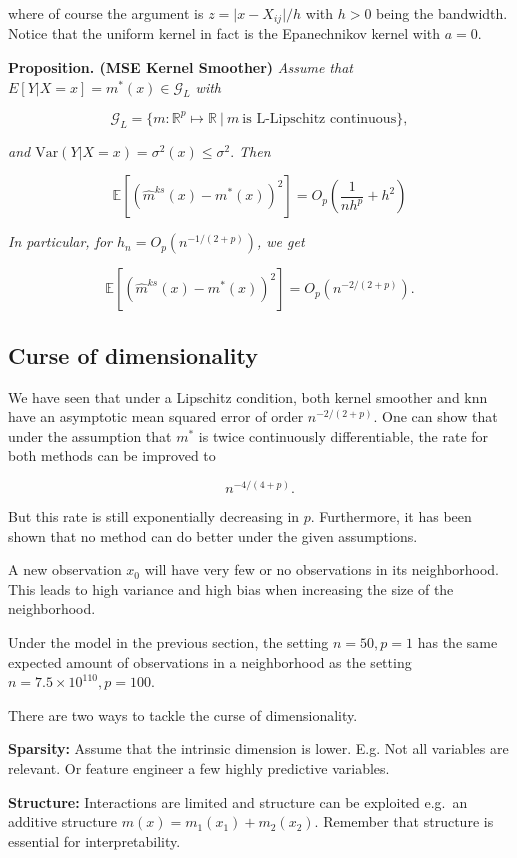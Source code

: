 \documentclass[a4paper,10pt,openany]{book}
\begin{document}
where of course the argument is \(z=\vert x-X_{ij}\vert/h\) with \(h>0\) being the bandwidth. Notice that the uniform kernel in fact is the Epanechnikov kernel with \(a=0\).

\textbf{Proposition. (MSE Kernel Smoother)} \emph{Assume that \(E[Y|X=x]=m^\ast(x)\in \mathcal G_L\) with}

\[
\mathcal G_L = \{m: \mathbb R^p \mapsto \mathbb R\ |\  m \ \text{is L-Lipschitz continuous}\},
\]

\emph{and \(\textrm{Var}(Y|X=x)=\sigma^2(x)\leq \sigma^2.\) Then }

\[
\mathbb E[(\hat m^{ks}(x)-m^\ast(x))^2]= O_p\left( \frac{1}{nh^p} + h^2 \right)
\]

\emph{In particular, for \(h_n=O_p(n^{-1/(2+p)})\), we get }

\[
\mathbb E[(\hat m^{ks}(x)-m^\ast(x))^2]=O_p(n^{-2/(2+p)}).
\]

\hypertarget{curse-of-dimensionality}{%
\subsection{Curse of dimensionality}\label{curse-of-dimensionality}}

We have seen that under a Lipschitz condition, both kernel smoother and knn have an asymptotic mean squared error of order \(n^{-2/(2+p)}\). One can show that under the assumption that \(m^\ast\) is twice continuously differentiable, the rate for both methods can be improved to

\[
n^{-4/(4+p)}.
\]

But this rate is still exponentially decreasing in \(p\). Furthermore, it has been shown that no method can do better under the given assumptions.

A new observation \(x_0\) will have very few or no observations in its neighborhood. This leads to high variance and high bias when increasing the size of the neighborhood.

Under the model in the previous section, the setting \(n=50,p=1\) has the same expected amount of observations in a neighborhood as the setting \(n=7.5\times10^{110}, p=100\).

There are two ways to tackle the curse of dimensionality.

\textbf{Sparsity:} Assume that the intrinsic dimension is lower. E.g. Not all variables are relevant. Or feature engineer a few highly predictive variables.

\textbf{Structure:} Interactions are limited and structure can be exploited
e.g.~an additive structure \(m(x)=m_1(x_1)+m_2(x_2)\). Remember that structure is essential for interpretability.
\end{document}
